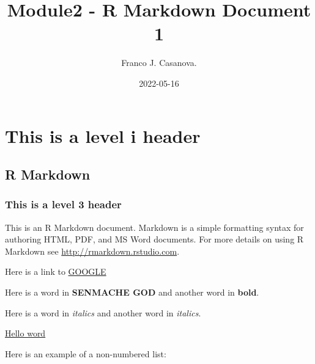 \documentclass[
]{article}
\title{Module2 - R Markdown Document 1}
\author{Franco J. Casanova.}
\date{2022-05-16}
\begin{document}
\maketitle

\hypertarget{this-is-a-level-i-header}{%
\section{This is a level i header}\label{this-is-a-level-i-header}}

\hypertarget{r-markdown}{%
\subsection{R Markdown}\label{r-markdown}}

\hypertarget{this-is-a-level-3-header}{%
\subsubsection{This is a level 3
header}\label{this-is-a-level-3-header}}

This is an R Markdown document. Markdown is a simple formatting syntax
for authoring HTML, PDF, and MS Word documents. For more details on
using R Markdown see \url{http://rmarkdown.rstudio.com}.

Here is a link to \href{http://google.com}{GOOGLE}

Here is a word in \textbf{SENMACHE GOD} and another word in
\textbf{bold}.

Here is a word in \emph{italics} and another word in \emph{italics}.

\href{https://www.youtube.com}{Hello word}

Here is an example of a non-numbered list:
\end{document}
